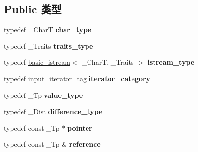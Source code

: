 \subsection*{Public 类型}
\begin{DoxyCompactItemize}
\item 
\mbox{\label{classistream__iterator_adbab49a3c33b333f06a18d5157ccf08d}} 
typedef \+\_\+\+CharT {\bfseries char\+\_\+type}
\item 
\mbox{\label{classistream__iterator_a019b4e9c7fb6559f48143b4a9926cb3f}} 
typedef \+\_\+\+Traits {\bfseries traits\+\_\+type}
\item 
\mbox{\label{classistream__iterator_ac28d45401f72c28cf852eab3fb7bd8cf}} 
typedef \hyperlink{classbasic__istream}{basic\+\_\+istream}$<$ \+\_\+\+CharT, \+\_\+\+Traits $>$ {\bfseries istream\+\_\+type}
\item 
\mbox{\label{classistream__iterator_a6af551e4ad307ec31636ad53e14e3f01}} 
typedef \hyperlink{structinput__iterator__tag}{input\+\_\+iterator\+\_\+tag} {\bfseries iterator\+\_\+category}
\item 
\mbox{\label{classistream__iterator_ae712f36ec7b2b4c33a6f2861ef5a51b0}} 
typedef \+\_\+\+Tp {\bfseries value\+\_\+type}
\item 
\mbox{\label{classistream__iterator_adef7dc3794e694e89bd87a880291c740}} 
typedef \+\_\+\+Dist {\bfseries difference\+\_\+type}
\item 
\mbox{\label{classistream__iterator_afe81be1c45f175fd78da3be89764738f}} 
typedef const \+\_\+\+Tp $\ast$ {\bfseries pointer}
\item 
\mbox{\label{classistream__iterator_a05b3c85282ece984630a7c3d24058c16}} 
typedef const \+\_\+\+Tp \& {\bfseries reference}
\end{DoxyCompactItemize}

